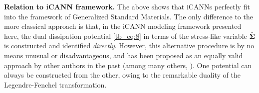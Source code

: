 \textbf{Relation to iCANN framework.} The above shows that iCANNs perfectly fit into the framework of Generalized Standard Materials. The only difference to the more classical approach is that, in the iCANN modeling framework presented here, the dual dissipation potential \eqref{tb_eq:8} in terms of the stress-like variable $\bar{\bm{\Sigma}}$ is constructed and identified \emph{directly}. However, this alternative procedure is by no means unusual or disadvantageous, and has been proposed as an equally valid approach by other authors in the past (among many others, \cite{LemaitreChaboche1994,Chaboche1997,LeuschnerFritzenEtAl2015,HoltzmanChrysochoosEtAl2018}). One potential can always be constructed from the other, owing to the remarkable duality of the Legendre-Fenchel transformation. 